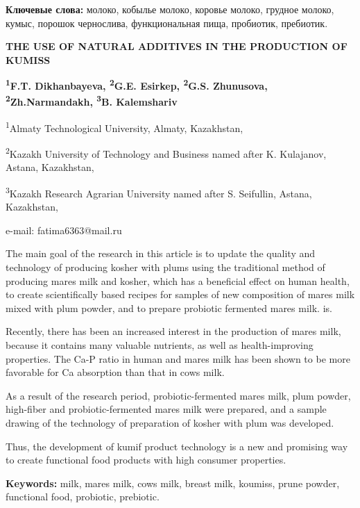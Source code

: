 {\bfseries Ключевые слова:} молоко, кобылье молоко, коровье молоко, грудное
молоко, кумыс, порошок чернослива, функциональная пища, пробиотик,
пребиотик.

\begin{center}
{\large\bfseries THE USE OF NATURAL ADDITIVES IN THE PRODUCTION OF KUMISS}

{\bfseries \textsuperscript{1}F.T. Dikhanbayeva\envelope, \textsuperscript{2}G.E. Esirkep, \textsuperscript{2}G.S. Zhunusova, \textsuperscript{2}Zh.Narmandakh, \textsuperscript{3}B. Kalemshariv}

\textsuperscript{1}Almaty Technological University, Almaty, Kazakhstan,

\textsuperscript{2}Kazakh University of Technology and Business named
after K. Kulajanov, Astana, Kazakhstan,

\textsuperscript{3}Kazakh Research Agrarian University named after S.
Seifullin, Astana, Kazakhstan,

e-mail: fatima6363@mail.ru
\end{center}

The main goal of the research in this article is to update the quality
and technology of producing kosher with plums using the traditional
method of producing mare\textquotesingle s milk and kosher, which has a
beneficial effect on human health, to create scientifically based
recipes for samples of new composition of mare\textquotesingle s milk
mixed with plum powder, and to prepare probiotic fermented
mare\textquotesingle s milk. is.

Recently, there has been an increased interest in the production of
mare\textquotesingle s milk, because it contains many valuable
nutrients, as well as health-improving properties. The Ca-P ratio in
human and mare\textquotesingle s milk has been shown to be more
favorable for Ca absorption than that in cow\textquotesingle s milk.

As a result of the research period, probiotic-fermented
mare\textquotesingle s milk, plum powder, high-fiber and
probiotic-fermented mare\textquotesingle s milk were prepared, and a
sample drawing of the technology of preparation of kosher with plum was
developed.

Thus, the development of kumif product technology is a new and promising
way to create functional food products with high consumer properties.

{\bfseries Keywords:} milk, mare\textquotesingle s milk,
cow\textquotesingle s milk, breast milk, koumiss, prune powder,
functional food, probiotic, prebiotic.

